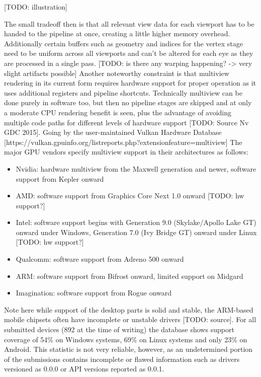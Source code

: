 [TODO: illustration]

The small tradeoff then is that all relevant view data for each viewport has to be handed to the pipeline at once, creating a little higher memory overhead. Additionally certain buffers such as geometry and indices for the vertex stage need to be uniform across all viewports and can't be altered for each eye as they are processed in a single pass. 
[TODO: is there any warping happening? -> very slight artifacts possible]
Another noteworthy constraint is that multiview rendering in its current form requires hardware support for proper operation as it uses additional registers and pipeline shortcuts. Technically multiview can be done purely in software too, but then no pipeline stages are skipped and at only a moderate CPU rendering benefit is seen, plus the advantage of avoiding multiple code paths for different levels of hardware support [TODO: Source Nv GDC 2015]. 
Going by the user-maintained Vulkan Hardware Database [https://vulkan.gpuinfo.org/listreports.php?extensionfeature=multiview]
The major GPU vendors specify multiview support in their architectures as follows: 
\begin{itemize}
\item Nvidia: hardware multiview from the Maxwell generation and newer, software support from Kepler onward
\item AMD: software support from Graphics Core Next 1.0 onward [TODO: hw support?]
\item Intel: software support begins with Generation 9.0 (Skylake/Apollo Lake GT) onward under Windows, Generation 7.0 (Ivy Bridge GT) onward under Linux [TODO: hw support?]
\item Qualcomm: software support from Adreno 500 onward
\item ARM: software support from Bifrost onward, limited support on Midgard
\item Imagination: software support from Rogue onward
\end{itemize}
Note here while support of the desktop parts is solid and stable, the ARM-based mobile chipsets often have incomplete or unstable drivers [TODO: source]. 
For all submitted devices (892 at the time of writing) the database shows support coverage of 54\% on Windows systems, 69\% on Linux systems and only 23\% on Android. This statistic is not very reliable, however, as an undetermined portion of the submissions contains incomplete or flawed information such as drivers versioned as 0.0.0 or API versions reported as 0.0.1. 

